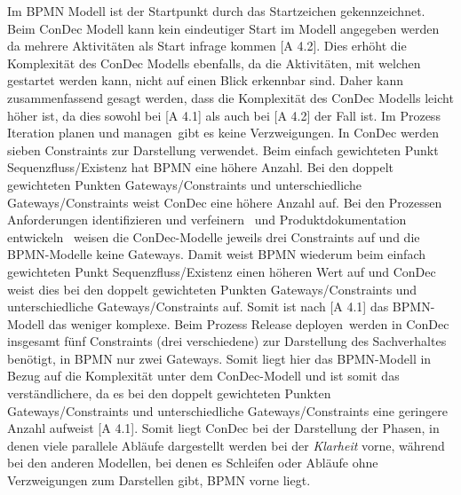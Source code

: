 Im BPMN Modell ist der Startpunkt durch das Startzeichen gekennzeichnet. Beim ConDec Modell kann kein eindeutiger Start im Modell angegeben werden da mehrere Aktivitäten als Start infrage kommen [A 4.2]. Dies erhöht die Komplexität des ConDec Modells ebenfalls, da die Aktivitäten, mit welchen gestartet werden kann, nicht auf einen Blick erkennbar sind. \newline
Daher kann zusammenfassend gesagt werden, dass die Komplexität des ConDec Modells leicht höher ist, da dies sowohl bei [A 4.1] als auch bei [A 4.2] der Fall ist.\newline
Im Prozess  \grqq Iteration planen und managen\grqq \ gibt es keine Verzweigungen. In ConDec werden sieben Constraints zur Darstellung verwendet. Beim einfach gewichteten Punkt Sequenzfluss/Existenz hat BPMN eine höhere Anzahl. Bei den doppelt gewichteten Punkten Gateways/Constraints und unterschiedliche Gateways/Constraints weist ConDec eine höhere Anzahl auf.\newline
Bei den Prozessen  \grqq Anforderungen identifizieren und verfeinern \grqq \ und  \grqq Produktdokumentation entwickeln \grqq \ weisen die ConDec-Modelle jeweils drei Constraints auf und die BPMN-Modelle keine Gateways. Damit weist BPMN wiederum beim einfach gewichteten Punkt Sequenzfluss/Existenz einen höheren Wert auf und ConDec weist dies bei den doppelt gewichteten Punkten Gateways/Constraints und unterschiedliche Gateways/Constraints auf. Somit ist nach [A 4.1] das BPMN-Modell das weniger komplexe.\newline
Beim Prozess \grqq Release deployen\grqq \ werden in ConDec insgesamt fünf Constraints (drei verschiedene) zur Darstellung des Sachverhaltes benötigt, in BPMN nur zwei Gateways. Somit liegt hier das BPMN-Modell in Bezug auf die Komplexität unter dem ConDec-Modell und ist somit das verständlichere, da es bei den doppelt gewichteten Punkten Gateways/Constraints und unterschiedliche Gateways/Constraints eine geringere Anzahl aufweist [A 4.1].\newline
Somit liegt ConDec bei der Darstellung der Phasen, in denen viele parallele Abläufe dargestellt werden bei der \textit{Klarheit} vorne, während bei den anderen Modellen, bei denen es Schleifen oder Abläufe ohne Verzweigungen zum Darstellen gibt, BPMN vorne liegt.\newline

